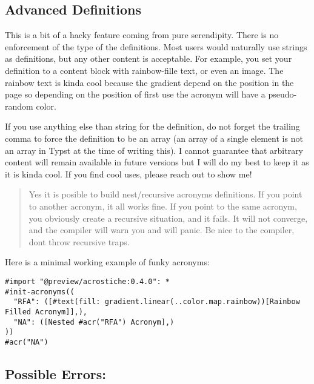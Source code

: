 \subsection{Advanced Definitions}\label{advanced-definitions-1}

This is a bit of a hacky feature coming from pure serendipity. There is
no enforcement of the type of the definitions. Most users would
naturally use strings as definitions, but any other content is
acceptable. For example, you set your definition to a content block with
rainbow-fille text, or even an image. The rainbow text is kinda cool
because the gradient depend on the position in the page so depending on
the position of first use the acronym will have a pseudo-random color.

If you use anything else than string for the definition, do not forget
the trailing comma to force the definition to be an array (an array of a
single element is not an array in Typst at the time of writing this). I
cannot guarantee that arbitrary content will remain available in future
versions but I will do my best to keep it as it is kinda cool. If you
find cool uses, please reach out to show me!

\begin{quote}
Yes it is posible to build nest/recursive acronyms definitions. If you
point to another acronym, it all works fine. If you point to the same
acronym, you obviously create a recursive situation, and it fails. It
will not converge, and the compiler will warn you and will panic. Be
nice to the compiler, don\textquotesingle t throw recursive traps.
\end{quote}

Here is a minimal working example of funky acronyms:

\begin{verbatim}
#import "@preview/acrostiche:0.4.0": *                                                           
#init-acronyms((
  "RFA": ([#text(fill: gradient.linear(..color.map.rainbow))[Rainbow Filled Acronym]],),                                                             
  "NA": ([Nested #acr("RFA") Acronym],)
))
#acr("NA")
\end{verbatim}

\subsection{Possible Errors:}\label{possible-errors}

